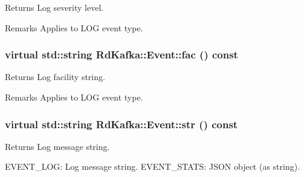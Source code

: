 \label{classRdKafka_1_1Event_ab98e758dea9aa13eb1421f625e206b16}
\begin{DoxyReturn}{Returns}
Log severity level. 
\end{DoxyReturn}
\begin{DoxyRemark}{Remarks}
Applies to LOG event type. 
\end{DoxyRemark}
\hypertarget{classRdKafka_1_1Event_a60dbe2545a614b2706594d384156dfa4}{
\subsubsection[{fac}]{\setlength{\rightskip}{0pt plus 5cm}virtual std::string RdKafka::Event::fac () const}}
\label{classRdKafka_1_1Event_a60dbe2545a614b2706594d384156dfa4}
\begin{DoxyReturn}{Returns}
Log facility string. 
\end{DoxyReturn}
\begin{DoxyRemark}{Remarks}
Applies to LOG event type. 
\end{DoxyRemark}
\hypertarget{classRdKafka_1_1Event_a94f84a103b017b21d7ede84fbbf9d7ed}{
\subsubsection[{str}]{\setlength{\rightskip}{0pt plus 5cm}virtual std::string RdKafka::Event::str () const}}
\label{classRdKafka_1_1Event_a94f84a103b017b21d7ede84fbbf9d7ed}
\begin{DoxyReturn}{Returns}
Log message string.
\end{DoxyReturn}
{\ttfamily EVENT\_\-LOG:} Log message string. {\ttfamily EVENT\_\-STATS:} JSON object (as string).

